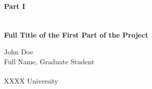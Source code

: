 \documentclass[letterpaper, 12pt, oneside]{book}
\theoremstyle{plain}
\theoremstyle{definition}
\theoremstyle{remark}
\begin{document}
\begin{titlepage}
\centering
\quad \\
\quad \\
\quad \\
\quad \\
\quad \\
\quad \\
\begingroup
    \fontsize{18pt}{20pt}\selectfont
    \textbf{Part I} \\
    \quad \\
    \quad \\
    \textbf{Full Title of the First Part of the Project}
\endgroup


\vspace{80pt}

\begingroup
\fontsize{16pt}{20pt}\selectfont
John Doe\\
Full Name, Graduate Student\\
\quad \\
XXXX University    
\endgroup


\end{titlepage}

\newpage




\newpage
\quad \vspace{-1in} %
\tableofcontents

\newpage
\quad \vspace{-1in} %
\listoffigures

\newpage
\quad \vspace{-1in} %
\listoftables
\end{document}

